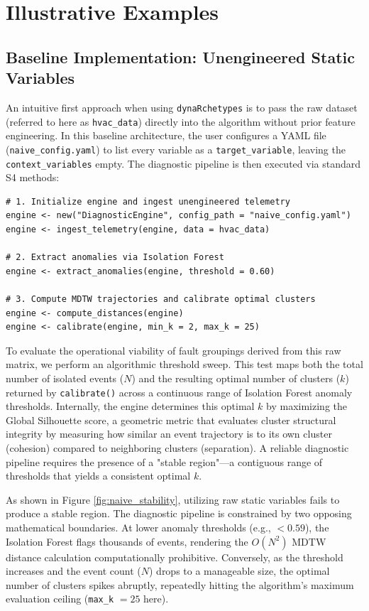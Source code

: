 \documentclass[final,3p,times]{elsarticle}
\begin{document}
\section{Illustrative Examples}

\subsection{Baseline Implementation: Unengineered Static Variables}

An intuitive first approach when using \texttt{dynaRchetypes} is to pass the raw dataset (referred to here as \texttt{hvac\_data}) directly into the algorithm without prior feature engineering. In this baseline architecture, the user configures a YAML file (\texttt{naive\_config.yaml}) to list every variable as a \texttt{target\_variable}, leaving the \texttt{context\_variables} empty. The diagnostic pipeline is then executed via standard S4 methods:

\begin{verbatim}
# 1. Initialize engine and ingest unengineered telemetry
engine <- new("DiagnosticEngine", config_path = "naive_config.yaml")
engine <- ingest_telemetry(engine, data = hvac_data)

# 2. Extract anomalies via Isolation Forest
engine <- extract_anomalies(engine, threshold = 0.60)

# 3. Compute MDTW trajectories and calibrate optimal clusters
engine <- compute_distances(engine)
engine <- calibrate(engine, min_k = 2, max_k = 25)
\end{verbatim}

To evaluate the operational viability of fault groupings derived from this raw matrix, we perform an algorithmic threshold sweep. This test maps both the total number of isolated events ($N$) and the resulting optimal number of clusters ($k$) returned by \texttt{calibrate()} across a continuous range of Isolation Forest anomaly thresholds. Internally, the engine determines this optimal $k$ by maximizing the Global Silhouette score, a geometric metric that evaluates cluster structural integrity by measuring how similar an event trajectory is to its own cluster (cohesion) compared to neighboring clusters (separation)\cite{rousseeuw1987silhouettes}. A reliable diagnostic pipeline requires the presence of a "stable region"---a contiguous range of thresholds that yields a consistent optimal $k$.

As shown in Figure \ref{fig:naive_stability}, utilizing raw static variables fails to produce a stable region. The diagnostic pipeline is constrained by two opposing mathematical boundaries. At lower anomaly thresholds (e.g., $<0.59$), the Isolation Forest flags thousands of events, rendering the $O(N^2)$ MDTW distance calculation computationally prohibitive. Conversely, as the threshold increases and the event count ($N$) drops to a manageable size, the optimal number of clusters spikes abruptly, repeatedly hitting the algorithm's maximum evaluation ceiling (\texttt{max\_k} $= 25$ here). 
\end{document}
